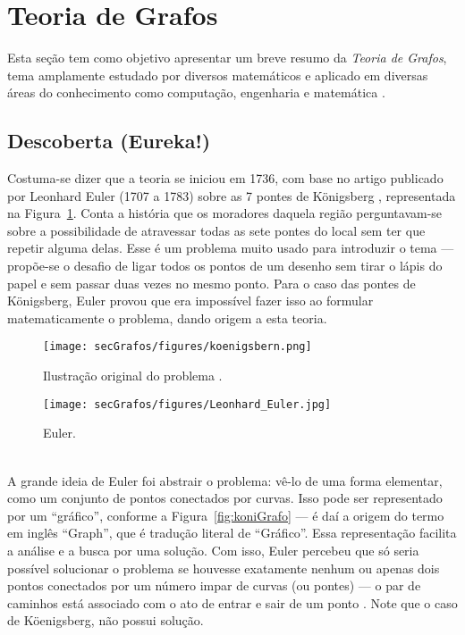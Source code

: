 \section{Teoria de Grafos\label{sec:grafos}}
Esta seção tem como objetivo apresentar um breve resumo da \textit{Teoria de Grafos}, tema amplamente estudado por diversos matemáticos e aplicado em diversas áreas do conhecimento como computação, engenharia e matemática \cite{graphTheoryApplicationsBondy}.

\subsection{Descoberta (Eureka!)}
Costuma-se dizer que a teoria se iniciou em 1736, com base no artigo publicado por Leonhard Euler (1707 a 1783) sobre as 7 pontes de Königsberg \cite{euler:KOENIGSBERG}, representada na Figura~\ref{fig:koni}. Conta a história que os moradores daquela região perguntavam-se sobre a possibilidade de atravessar todas as sete pontes do local sem ter que repetir alguma delas. Esse é um problema muito usado para introduzir o tema \cite{problemsInMath} --- propõe-se o desafio de ligar todos os pontos de um desenho sem tirar o lápis do papel e sem passar duas vezes no mesmo ponto. Para o caso das pontes de Königsberg, Euler provou que era impossível fazer isso ao formular matematicamente o problema, dando origem a esta teoria.

\begin{minipage}{0.60 \linewidth}
	\begin{figure}[H]
		\begin{center}
			\texttt{[image: secGrafos/figures/koenigsbern.png]}
		\end{center}
		\caption{Ilustração original do problema \cite{euler:KOENIGSBERG}.}
		\label{fig:koni}
	\end{figure}
\end{minipage}
\hspace{0.1cm}
\begin{minipage}{0.35 \linewidth}
	\begin{figure}[H]
		\begin{center}
			\texttt{[image: secGrafos/figures/Leonhard\_Euler.jpg]}
		\end{center}
		\caption{Euler.}
		\label{fig:euler}
	\end{figure}
\end{minipage}
\\

A grande ideia de Euler foi abstrair o problema: vê-lo de uma forma elementar, como um conjunto de pontos conectados por curvas. Isso pode ser representado por um ``gráfico'', conforme a Figura~\ref{fig:koniGrafo} --- é daí a origem do termo em inglês ``Graph'', que é tradução literal de ``Gráfico''. Essa representação facilita a análise e a busca por uma solução. Com isso, Euler percebeu que só seria possível solucionar o problema se houvesse exatamente nenhum ou apenas dois pontos conectados por um número impar de curvas (ou pontes) --- o par de caminhos está associado com o ato de entrar e sair de um ponto \cite{euler:KOENIGSBERG}. Note que o caso de Köenigsberg, não possui solução.

